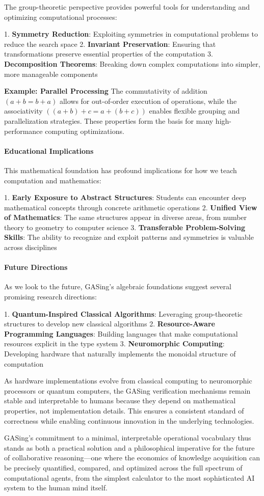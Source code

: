 The group-theoretic perspective provides powerful tools for understanding and optimizing computational processes:

1. \textbf{Symmetry Reduction}: Exploiting symmetries in computational problems to reduce the search space
2. \textbf{Invariant Preservation}: Ensuring that transformations preserve essential properties of the computation
3. \textbf{Decomposition Theorems}: Breaking down complex computations into simpler, more manageable components

\textbf{Example: Parallel Processing}
The commutativity of addition $(a + b = b + a)$ allows for out-of-order execution of operations, while the associativity $((a + b) + c = a + (b + c))$ enables flexible grouping and parallelization strategies. These properties form the basis for many high-performance computing optimizations.
\paragraph{Educational Implications}

This mathematical foundation has profound implications for how we teach computation and mathematics:

1. \textbf{Early Exposure to Abstract Structures}: Students can encounter deep mathematical concepts through concrete arithmetic operations
2. \textbf{Unified View of Mathematics}: The same structures appear in diverse areas, from number theory to geometry to computer science
3. \textbf{Transferable Problem-Solving Skills}: The ability to recognize and exploit patterns and symmetries is valuable across disciplines
\paragraph{Future Directions}

As we look to the future, GASing's algebraic foundations suggest several promising research directions:

1. \textbf{Quantum-Inspired Classical Algorithms}: Leveraging group-theoretic structures to develop new classical algorithms
2. \textbf{Resource-Aware Programming Languages}: Building languages that make computational resources explicit in the type system
3. \textbf{Neuromorphic Computing}: Developing hardware that naturally implements the monoidal structure of computation

As hardware implementations evolve from classical computing to neuromorphic processors or quantum computers, the GASing verification mechanisms remain stable and interpretable to humans because they depend on mathematical properties, not implementation details. This ensures a consistent standard of correctness while enabling continuous innovation in the underlying technologies.

GASing's commitment to a minimal, interpretable operational vocabulary thus stands as both a practical solution and a philosophical imperative for the future of collaborative reasoning—one where the economics of knowledge acquisition can be precisely quantified, compared, and optimized across the full spectrum of computational agents, from the simplest calculator to the most sophisticated AI system to the human mind itself.
